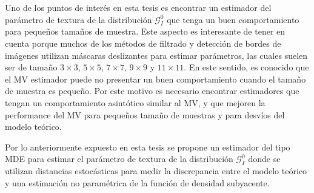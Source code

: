 Uno de los puntos de interés en esta tesis es encontrar un estimador del parámetro de  textura de la distribución $\mathcal{G}_I^{0}$ que tenga un buen comportamiento para pequeños tamaños de muestra. Este aspecto es interesante de tener en cuenta porque muchos de los métodos de filtrado y detección de bordes de imágenes utilizan máscaras deslizantes para estimar parámetros, las cuales suelen ser de tamaño $3 \times 3$, $5 \times 5$, $7 \times 7$, $9 \times 9$ y $11 \times 11$. 
En este sentido, es conocido que el MV estimador puede no presentar un buen comportamiento cuando el tamaño de muestra es pequeño. 
Por este motivo es necesario encontrar estimadores que tengan un comportamiento asintótico similar al MV, y que mejoren la performance del MV para pequeños tamaño de muestras y para desvíos del modelo teórico.

Por lo anteriormente expuesto en esta tesis se propone un estimador del tipo MDE para estimar el parámetro de textura de la distribución $\mathcal{G}_I^{0}$ donde se utilizan distancias estocásticas para medir la discrepancia entre el modelo teórico y  una estimación no paramétrica de la función de densidad subyacente. 


%
%
%

